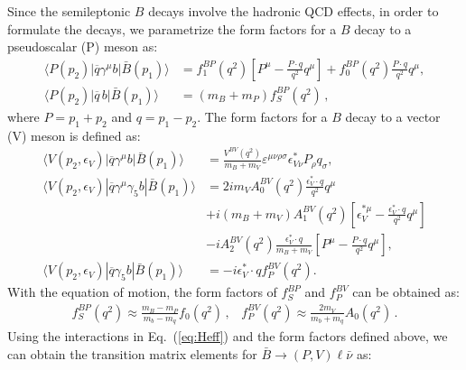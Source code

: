 \documentclass[prd,preprint,superscriptaddress,amsmath,amssymb]{revtex4}
\begin{document}
 Since the semileptonic $B$ decays involve the hadronic  QCD effects, in order to formulate the decays, we parametrize the form factors for  a $B$ decay to a pseudoscalar (P) meson as:
  \begin{align}
  \langle P (p_2)|\overline {q} \gamma^{\mu} b | \bar B (p_1)\rangle
   &= f^{B P}_1(q^2)\left[ P^{\mu}-\frac{P\cdot q}{q^2}q^{\mu} \right]  + f^{B P}_0(q^2)\frac{P\cdot q }{q^2}q^{\mu}, \nonumber \\
\langle P(p_2)| \overline{ q}  \, b |\bar B (p_1) \rangle & = ({m_{B}+m_{P}}) f^{B P}_S(q^2)\,,\label{eq:ffBP}
 \end{align}
where $P=p_1 + p_2$ and $q=p_1 -p_2$. The form factors for a $B$ decay to a vector (V) meson is defined as:
 \begin{align}
  \langle V(p_2,\epsilon_V)|\overline {q} \gamma^{\mu}b|  \bar B(p_1)\rangle
   &= \frac{V^{B V} (q^2)}{m_{B}+m_{V}}\varepsilon^{\mu\nu\rho\sigma}
     \epsilon^*_{V \nu}P_{\rho}q_{\sigma}, \nonumber\\
  \langle V(p_2,\epsilon_V)| \overline {q} \gamma^{\mu}\gamma_5 b|
  \bar B (p_1)\rangle
   &=2im_{V} A^{B V}_0(q^2)\frac{\epsilon^*_V \cdot q}{q^2}q^{\mu} \nonumber \\
  &  +i(m_{B}+m_{V})A^{B V}_1(q^2)\left[\epsilon^{*\mu}_{V}
    -\frac{\epsilon^*_V \cdot q}{q^2}q^{\mu} \right] \nonumber\\
    &-iA^{B V}_2(q^2)\frac{\epsilon^*_V \cdot q}{m_{B}+m_{V}}
     \left[ P^{\mu}-\frac{P\cdot q }{q^2}q^{\mu} \right],
     \nonumber\\
\langle V (p_2, \epsilon_V )| \overline {q} \gamma_5 b | \bar B (p_1)
\rangle & = -i \epsilon^*_V \cdot q f^{BV}_P(q^2). \label{eq:ffBV}
 \end{align}
 With the equation of motion, the form factors of $f^{BP}_S$ and $f^{BV}_P$ can be obtained  as:
\begin{eqnarray}
f^{BP}_S(q^2)\approx  \frac{m_B-m_P}{ m_b-m_q } f_0(q^2)\,, \;\;\;
 f^{BV}_P(q^2)\approx   \frac{2 m_{V}}{m_b +m_q}  A_0(q^2)\,. 
\end{eqnarray}
 Using the interactions in Eq.~(\ref{eq:Heff}) and the form factors defined above,  we can obtain the transition matrix elements for $\bar B\to (P,V) \ell \bar\nu$  as:
\end{document}
